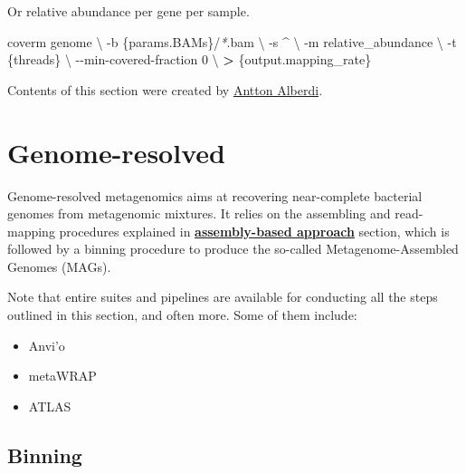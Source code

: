 \documentclass[
]{book}
\newenvironment{Shaded}{\begin{snugshade}}{\end{snugshade}}
\newcommand{\AttributeTok}[1]{\textcolor[rgb]{0.77,0.63,0.00}{#1}}
\newcommand{\DataTypeTok}[1]{\textcolor[rgb]{0.13,0.29,0.53}{#1}}
\newcommand{\ExtensionTok}[1]{#1}
\newcommand{\NormalTok}[1]{#1}
\newcommand{\OperatorTok}[1]{\textcolor[rgb]{0.81,0.36,0.00}{\textbf{#1}}}
\newcommand{\PreprocessorTok}[1]{\textcolor[rgb]{0.56,0.35,0.01}{\textit{#1}}}
\providecommand{\tightlist}{%
  \setlength{\itemsep}{0pt}\setlength{\parskip}{0pt}}
\begin{document}
\normalsize

Or relative abundance per gene per sample.

\small

\begin{Shaded}
\begin{Highlighting}[]
\ExtensionTok{coverm}\NormalTok{ genome }\DataTypeTok{\textbackslash{}}
      \AttributeTok{{-}b}\NormalTok{ \{params.BAMs\}/}\PreprocessorTok{*}\NormalTok{.bam }\DataTypeTok{\textbackslash{}}
      \AttributeTok{{-}s}\NormalTok{ \^{} }\DataTypeTok{\textbackslash{}}
      \AttributeTok{{-}m}\NormalTok{ relative\_abundance }\DataTypeTok{\textbackslash{}}
      \AttributeTok{{-}t}\NormalTok{ \{threads\} }\DataTypeTok{\textbackslash{}}
      \AttributeTok{{-}{-}min{-}covered{-}fraction}\NormalTok{ 0 }\DataTypeTok{\textbackslash{}}
      \OperatorTok{\textgreater{}}\NormalTok{ \{output.mapping\_rate\}}
\end{Highlighting}
\end{Shaded}

\normalsize

Contents of this section were created by \protect\hyperlink{antton-alberdi}{Antton Alberdi}.

\hypertarget{genome-resolved}{%
\section{Genome-resolved}\label{genome-resolved}}

Genome-resolved metagenomics aims at recovering near-complete bacterial genomes from metagenomic mixtures. It relies on the assembling and read-mapping procedures explained in \textbf{\protect\hyperlink{assembly-based}{assembly-based approach}} section, which is followed by a binning procedure to produce the so-called Metagenome-Assembled Genomes (MAGs).

Note that entire suites and pipelines are available for conducting all the steps outlined in this section, and often more. Some of them include:

\begin{itemize}
\tightlist
\item
  Anvi'o
\item
  metaWRAP
\item
  ATLAS
\end{itemize}

\hypertarget{genome-resolved-binning}{%
\subsection*{Binning}\label{genome-resolved-binning}}
\end{document}
